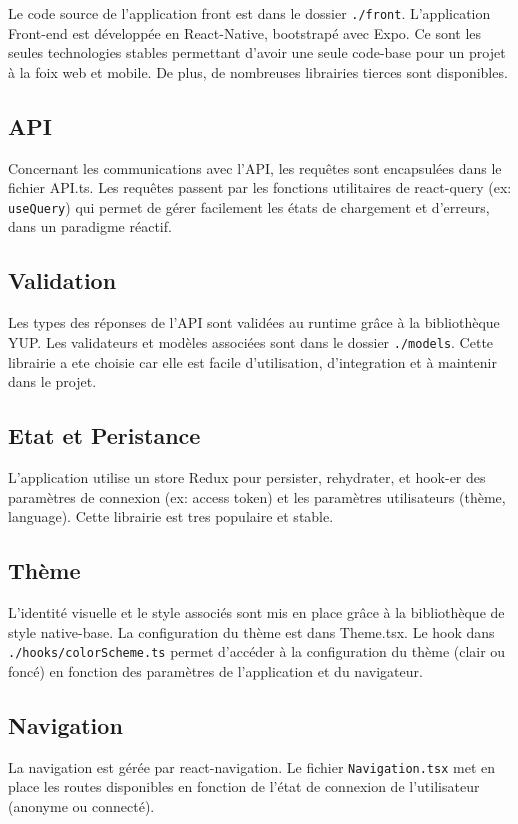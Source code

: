 Le code source de l’application front est dans le  dossier \verb|./front|.
L’application Front-end est développée en React-Native, bootstrapé avec Expo. Ce sont les seules technologies stables permettant d'avoir une seule code-base pour un projet à la foix web et mobile. De plus, de nombreuses librairies tierces sont disponibles.

\subsection*{API}
Concernant les communications avec l’API, les requêtes sont encapsulées dans le fichier API.ts. Les requêtes passent par les fonctions utilitaires de react-query (ex: \verb|useQuery|) qui permet de gérer facilement les états de chargement et d’erreurs, dans un paradigme réactif.

\subsection*{Validation}
Les types des réponses de l’API sont validées au runtime grâce à la bibliothèque YUP. Les validateurs et modèles associées sont dans le dossier \verb|./models|. Cette librairie a ete choisie car elle est facile d'utilisation, d'integration et à maintenir dans le projet.

\subsection*{Etat et Peristance}
L’application utilise un store Redux pour persister, rehydrater, et hook-er des paramètres de connexion (ex: access token) et les paramètres utilisateurs (thème, language). Cette librairie est tres populaire et stable. 

\subsection*{Thème}
L’identité visuelle et le style associés sont mis en place grâce à la bibliothèque de style native-base. La configuration du thème est dans Theme.tsx. Le hook dans \verb|./hooks/colorScheme.ts| permet d’accéder à la configuration du thème (clair ou foncé) en fonction des paramètres de l’application et du navigateur.

\subsection*{Navigation}
La navigation est gérée par react-navigation. Le fichier \verb|Navigation.tsx| met en place les routes disponibles en fonction de l’état de connexion de l’utilisateur (anonyme ou connecté).

